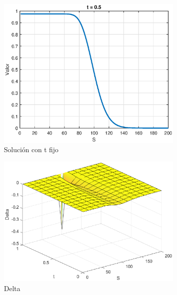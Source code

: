 \begin{figure}[H]
\begin{subfigure}[b]{0.35\linewidth}
    \end{subfigure}
    \begin{subfigure}[b]{0.35\linewidth}
        \includegraphics[width=\linewidth]{Imagenes/Parte1/6_Sols/Binary_Put/BinaryPuttFIjo.eps}
        \caption{Solución con t fijo}
    \end{subfigure}
    \begin{subfigure}[b]{0.35\linewidth}
        \includegraphics[width=\linewidth]{Imagenes/Parte1/6_Sols/Binary_Put/Binary_Put_Delta.eps}
        \caption{Delta}
    \end{subfigure}
    \begin{subfigure}[b]{0.35\linewidth}

\end{subfigure}
\end{figure}
